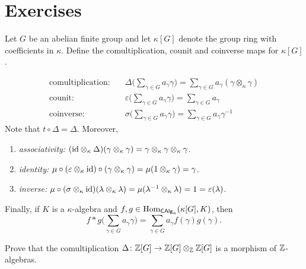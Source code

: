 \section{Exercises}

\begin{exr}\label{exr:ring-group-hopf-algebra}
    Let\/ $G$ be an abelian finite group and let\/ $\kappa[G]$ denote the group ring with coefficients in\/ $\kappa$. Define the comultiplication, counit and coinverse maps for\/ $\kappa[G]$.
\end{exr}

\begin{solution}
    \begin{align*}
        \text{comultiplication:}
            &\quad\Delta\Big(\sum_{\gamma\in G}a_\gamma\gamma\Big)
            = \sum_{\gamma\in G}a_\gamma(\gamma\otimes_\kappa\gamma)\\
        \text{counit:}
            &\quad\varepsilon\Big(\sum_{\gamma\in G}a_\gamma\gamma\Big)
            = \sum_{\gamma\in G}a_\gamma\\
        \text{coinverse:}
            &\quad\sigma\Big(\sum_{\gamma\in G}a_\gamma\gamma\Big)
            = \sum_{\gamma\in G}a_\gamma\gamma^{-1}
    \end{align*}
    Note that $t\circ\Delta=\Delta$. Moreover,
    \begin{enumerate}[-]
        \item \textit{associativity:} $(\text{\rm id}\otimes_\kappa\Delta)
        (\gamma\otimes_\kappa\gamma)
            = \gamma\otimes_\kappa\gamma\otimes_\kappa\gamma$.

        \item \textit{identity:}
            $\mu\circ(\varepsilon\otimes_\kappa\text{\rm id})
            \circ(\gamma\otimes_\kappa\gamma)
            = \mu(1\otimes_\kappa\gamma)=\gamma$.

        \item \textit{inverse:} $\mu\circ(\sigma\otimes_\kappa\text{\rm id})
            (\lambda\otimes_\kappa\lambda)
            = \mu(\lambda^{-1}\otimes_\kappa\lambda)
            = 1 = \varepsilon(\lambda)$.
    \end{enumerate}
    Finally, if $K$ is a $\kappa$-algebra and $f,g\in{\rm Hom}_{\mathsf{CAlg}_\kappa}(\kappa[G],K)$, then
    $$
        f*g\Big(\sum_{\gamma\in G}a_\gamma\gamma\Big)
            = \sum_{\gamma\in G}a_\gamma f(\gamma)g(\gamma).
    $$
\end{solution}

\begin{exr}
    Prove that the comultiplication\/ $\Delta\colon\mathbb{Z}[G]\to\mathbb{Z}[G]\otimes_{\mathbb{Z}}\mathbb{Z}[G]$ is a morphism of\/ $\mathbb{Z}$-algebras.
\end{exr}

